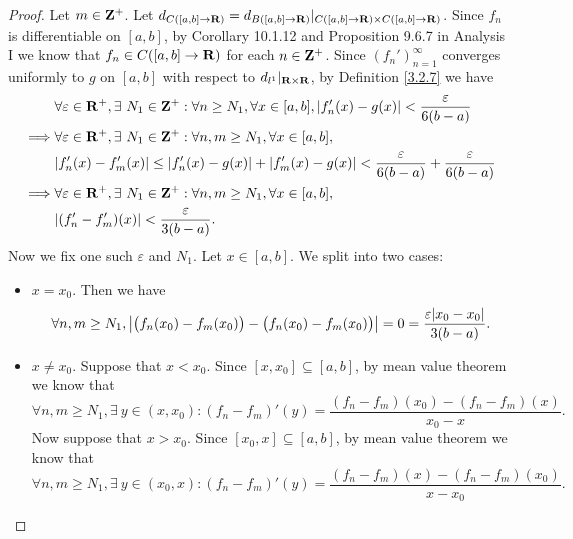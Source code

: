 \begin{proof}
    Let \(m \in \mathbf{Z}^+\).
    Let \(d_{C([a, b] \to \mathbf{R})} = d_{B([a, b] \to \mathbf{R})}|_{C([a, b] \to \mathbf{R}) \times C([a, b] \to \mathbf{R})}\).
    Since \(f_n\) is differentiable on \([a, b]\), by Corollary 10.1.12 and Proposition 9.6.7 in Analysis I we know that \(f_n \in C([a, b] \to \mathbf{R})\) for each \(n \in \mathbf{Z}^+\).
    Since \((f_n')_{n = 1}^\infty\) converges uniformly to \(g\) on \([a, b]\) with respect to \(d_{l^1}|_{\mathbf{R} \times \mathbf{R}}\), by Definition \ref{3.2.7} we have
    \begin{align*}
                 & \forall \varepsilon \in \R^+, \exists\ N_1 \in \Z^+ : \forall n \geq N_1, \forall x \in [a, b], \abs{f_n'(x) - g(x)} < \frac{\varepsilon}{6(b - a)} \\
        \implies & \forall \varepsilon \in \R^+, \exists\ N_1 \in \Z^+ : \forall n, m \geq N_1, \forall x \in [a, b],                                                  \\
                 & \abs{f_n'(x) - f_m'(x)} \leq \abs{f_n'(x) - g(x)} + \abs{f_m'(x) - g(x)} < \frac{\varepsilon}{6(b - a)} + \frac{\varepsilon}{6(b - a)}              \\
        \implies & \forall \varepsilon \in \R^+, \exists\ N_1 \in \Z^+ : \forall n, m \geq N_1, \forall x \in [a, b],                                                  \\
                 & \abs{(f_n' - f_m')(x)} < \frac{\varepsilon}{3(b - a)}.
    \end{align*}
    Now we fix one such \(\varepsilon\) and \(N_1\).
    Let \(x \in [a, b]\).
    We split into two cases:
    \begin{itemize}
        \item \(x = x_0\).
              Then we have
              \[
                  \forall n, m \geq N_1, \abs{\big(f_n(x_0) - f_m(x_0)\big) - \big(f_n(x_0) - f_m(x_0)\big)} = 0 = \frac{\varepsilon \abs{x_0 - x_0}}{3(b - a)}.
              \]
        \item \(x \neq x_0\).
              Suppose that \(x < x_0\).
              Since \([x, x_0] \subseteq [a, b]\), by mean value theorem we know that
              \[
                  \forall n, m \geq N_1, \exists\ y \in (x, x_0) : (f_n - f_m)'(y) = \frac{(f_n - f_m)(x_0) - (f_n - f_m)(x)}{x_0 - x}.
              \]
              Now suppose that \(x > x_0\).
              Since \([x_0, x] \subseteq [a, b]\), by mean value theorem we know that
              \[
                  \forall n, m \geq N_1, \exists\ y \in (x_0, x) : (f_n - f_m)'(y) = \frac{(f_n - f_m)(x) - (f_n - f_m)(x_0)}{x - x_0}.
\]
\end{itemize}
\end{proof}
